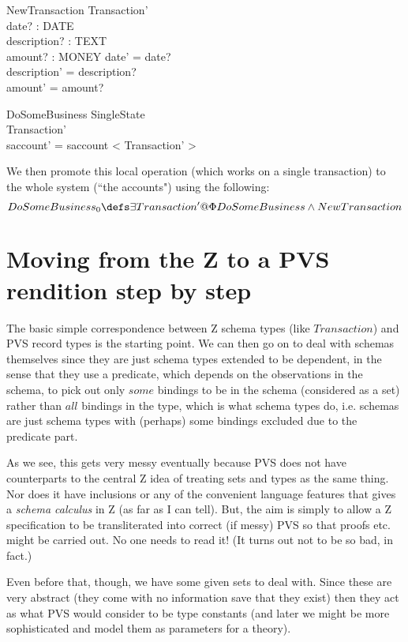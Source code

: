 \documentclass[11pt]{amsart}
\begin{document}
\begin{schema}{NewTransaction}
Transaction'\\
date? : DATE\\
description? : TEXT\\
amount? : MONEY
\where
date' = date?\\
description' = description?\\
amount' = amount?
\end{schema}

\begin{schema}{\Phi DoSomeBusiness}
\Delta SingleState\\
Transaction'\\
\where
saccount' = saccount \cat < \theta Transaction' >
\end{schema}

We then promote this local operation (which works on a single transaction) to the whole system (``the accounts") using the following:
\[
DoSomeBusiness_0 \defs \exists Transaction' @ \Phi DoSomeBusiness \land New Transaction
\]

\section{Moving from the Z to a PVS rendition step by step}

The basic simple correspondence between Z schema types (like $Transaction$) and PVS record types is the starting point. We can then go on to deal with schemas themselves since they are just schema types extended to be dependent, in the sense that they use a predicate, which depends on the observations in the schema, to pick out only $some$ bindings to be in the schema (considered as a set) rather than $all$ bindings in the type, which is what schema types do, i.e. schemas are just schema types with (perhaps) some bindings excluded due to the predicate part.

As we see, this gets very messy eventually because PVS does not have counterparts to the central Z idea of treating sets and types as the same thing. Nor does it have inclusions or any of the convenient language features that gives a \emph{schema calculus} in Z (as far as I can tell). But, the aim is simply to allow a Z specification to be transliterated into correct (if messy) PVS so that proofs etc. might be carried out. No one needs to read it! (It turns out not to be so bad, in fact.)

Even before that, though, we have some given sets to deal with. Since these are very abstract (they come with no information save that they exist) then they act as what PVS would consider to be type constants (and later we might be more sophisticated and model them as parameters for a theory).
\end{document}
